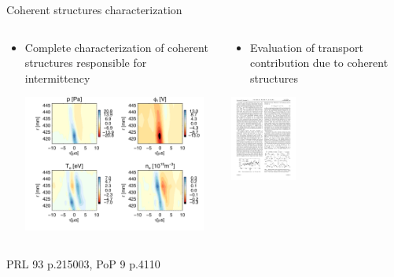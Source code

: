 \documentclass[t,10pt]{beamer}
\begin{document}
\begin{frame}{Coherent structures characterization}


\begin{columns}[t]
\begin{column}{0.47\textwidth}
\begin{itemize}
\item Complete characterization of coherent structures responsible for
  intermittency 
\begin{center}
\includegraphics[height=4.5cm]{2Dstructure}
\end{center}
\end{itemize}
\end{column}
\pause
\begin{column}{0.5\textwidth}
\begin{itemize}
\item Evaluation of transport contribution due to coherent structures
\end{itemize}
\begin{center}
\includegraphics[height=2.8cm]{structure-diffusivity}
\end{center}
\end{column}
\end{columns}
\begin{center}
{\tiny PRL 93 p.215003, PoP 9 p.4110}
\end{center}
\end{frame}
\end{document}
